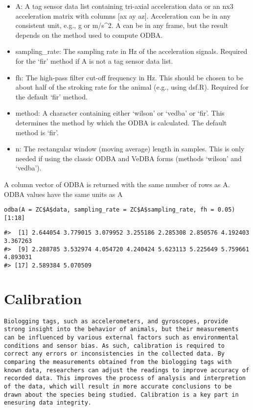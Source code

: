 \begin{itemize}
\tightlist
\item
  A: A tag sensor data list containing tri-axial acceleration data or an nx3 acceleration matrix with columns {[}ax ay az{]}. Acceleration can be in any consistent unit, e.g., g or m/s\^{}2. A can be in any frame, but the result depends on the method used to compute ODBA.
\item
  sampling\_rate: The sampling rate in Hz of the acceleration signals. Required for the `fir' method if A is not a tag sensor data list.
\item
  fh: The high-pass filter cut-off frequency in Hz. This should be chosen to be about half of the stroking rate for the animal (e.g., using dsf.R). Required for the default `fir' method.
\item
  method: A character containing either `wilson' or `vedba' or `fir'. This determines the method by which the ODBA is calculated. The default method is `fir'.
\item
  n: The rectangular window (moving average) length in samples. This is only needed if using the classic ODBA and VeDBA forms (methods `wilson' and `vedba').
\end{itemize}

A column vector of ODBA is returned with the same number of rows as A. ODBA values have the same units as A

\begin{verbatim}
odba(A = ZC$A$data, sampling_rate = ZC$A$sampling_rate, fh = 0.05)[1:18]
\end{verbatim}

\begin{verbatim}
#>  [1] 2.644054 3.779015 3.079952 3.255186 2.285308 2.850576 4.192403 3.367263
#>  [9] 2.288785 3.532974 4.054720 4.240424 5.623113 5.225649 5.759661 4.893031
#> [17] 2.589384 5.070509
\end{verbatim}

\hypertarget{calibration}{%
\section{Calibration}\label{calibration}}

\begin{verbatim}
Biologging tags, such as accelerometers, and gyroscopes, provide strong insight into the behavior of animals, but their measurements can be influenced by various external factors such as environmental conditions and sensor bias. As such, calibration is required to correct any errors or inconsistencies in the collected data. By comparing the measurements obtained from the biologging tags with known data, researchers can adjust the readings to improve accuracy of recorded data. This improves the process of analysis and interpretion of the data, which will result in more accurate conclusions to be drawn about the species being studied. Calibration is a key part in enesuring data integrity.
\end{verbatim}

